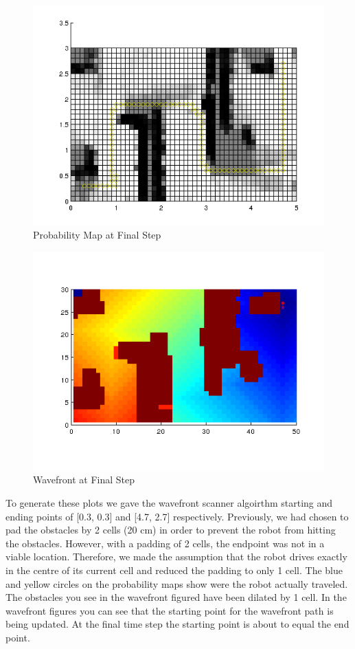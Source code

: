 \documentclass[12pt]{article}
\begin{document}
\begin{figure}[ht]
\hspace{0.5cm}
\centering
\includegraphics[scale=0.5]{Pictures/final_actual_scan.png}
\caption{Probability Map at Final Step}
\end{figure}

\begin{figure}[ht]
\hspace{0.5cm}
\centering
\includegraphics[scale=0.7]{Pictures/final_wave.png}
\caption{Wavefront at Final Step}
\end{figure}

To generate these plots we gave the wavefront scanner algoirthm starting and ending points of [0.3, 0.3] and [4.7, 2.7] respectively. Previously, we had chosen to pad the obstacles by 2 cells (20 cm) in order to prevent the robot from hitting the obstacles. However, with a padding of 2 cells, the endpoint was not in a viable location. Therefore, we made the assumption that the robot drives exactly in the centre of its current cell and reduced the padding to only 1 cell.  The blue and yellow circles on the probability maps show were the robot actually traveled. The obstacles you see in the wavefront figured have been dilated by 1 cell. In the wavefront figures you can see that the starting point for the wavefront path is being updated. At the final time step the starting point is about to equal the end point. 
 
 
\end{document}
